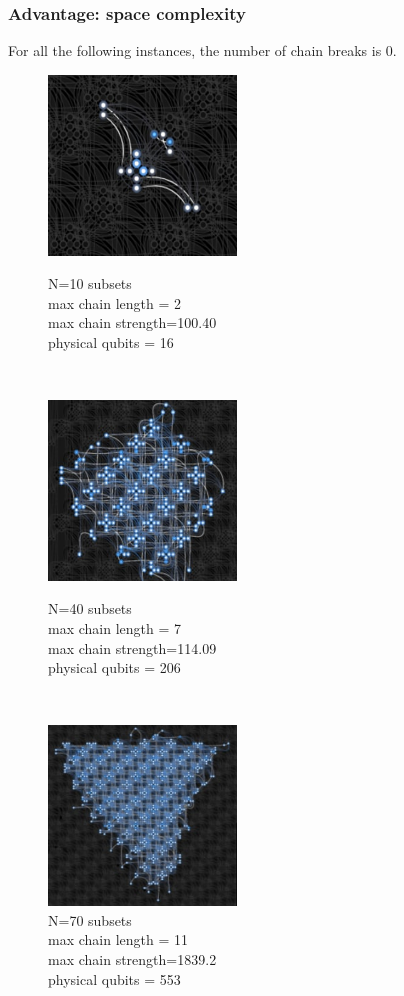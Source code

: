 \documentclass[oneside,a4paper]{article}
\begin{document}
\subsubsection{Advantage: space complexity}
For all the following instances, the number of chain breaks is 0.
\begin{figure}[htp]
\begin{minipage}[b]{4.5cm}
\includegraphics[width=5cm]{LaTeXTemplate/Images/AdvantageN10.png}
\caption{N=10 subsets\\max chain length = 2\\max chain strength=100.40\\physical qubits = 16}
\end{minipage}
\ \hspace{2mm} \hspace{2mm} \
\begin{minipage}[b]{4.5cm}
\includegraphics[width=5cm]{LaTeXTemplate/Images/AdvantageN40.png}
\caption{N=40 subsets\\max chain length = 7\\max chain strength=114.09\\physical qubits = 206}
\end{minipage}
\ \hspace{2mm} \hspace{2mm} \
\begin{minipage}[b]{4.5cm}
\centering
\includegraphics[width=5cm]{LaTeXTemplate/Images/AdvantageN70.png}
\caption{N=70 subsets\\max chain length = 11\\max chain strength=1839.2\\physical qubits = 553}
\end{minipage}
\end{figure}
\end{document}

